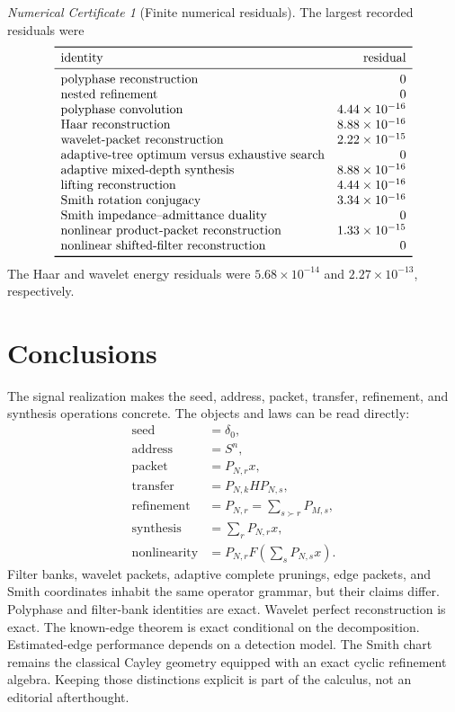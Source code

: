 \documentclass[11pt]{article}
\theoremstyle{definition}
\theoremstyle{remark}
\newtheorem{certificate}[theorem]{Numerical Certificate}
\begin{document}
\begin{certificate}[Finite numerical residuals]
The largest recorded residuals were
\[
\begin{array}{lr}
\toprule
\text{identity}&\text{residual}\\
\midrule
\text{polyphase reconstruction}&0\\
\text{nested refinement}&0\\
\text{polyphase convolution}&4.44\times10^{-16}\\
\text{Haar reconstruction}&8.88\times10^{-16}\\
\text{wavelet-packet reconstruction}&2.22\times10^{-15}\\
\text{adaptive-tree optimum versus exhaustive search}&0\\
\text{adaptive mixed-depth synthesis}&8.88\times10^{-16}\\
\text{lifting reconstruction}&4.44\times10^{-16}\\
\text{Smith rotation conjugacy}&3.34\times10^{-16}\\
\text{Smith impedance--admittance duality}&0\\
\text{nonlinear product-packet reconstruction}&1.33\times10^{-15}\\
\text{nonlinear shifted-filter reconstruction}&0\\
\bottomrule
\end{array}
\]
The Haar and wavelet energy residuals were $5.68\times10^{-14}$ and $2.27\times10^{-13}$, respectively.
\end{certificate}

\section{Conclusions}

The signal realization makes the seed, address, packet, transfer, refinement, and synthesis operations concrete. The objects and laws can be read directly:
\[
\boxed{
\begin{aligned}
\text{seed}&=\delta_0,\\
\text{address}&=S^n,\\
\text{packet}&=P_{N,r}x,\\
\text{transfer}&=P_{N,k}HP_{N,s},\\
\text{refinement}&=P_{N,r}=\sum_{s\succ r}P_{M,s},\\
\text{synthesis}&=\sum_rP_{N,r}x,\\
\text{nonlinearity}&=P_{N,r}F\left(\sum_sP_{N,s}x\right).
\end{aligned}
}
\]
Filter banks, wavelet packets, adaptive complete prunings, edge packets, and Smith coordinates inhabit the same operator grammar, but their claims differ. Polyphase and filter-bank identities are exact. Wavelet perfect reconstruction is exact. The known-edge theorem is exact conditional on the decomposition. Estimated-edge performance depends on a detection model. The Smith chart remains the classical Cayley geometry equipped with an exact cyclic refinement algebra. Keeping those distinctions explicit is part of the calculus, not an editorial afterthought.
\end{document}

